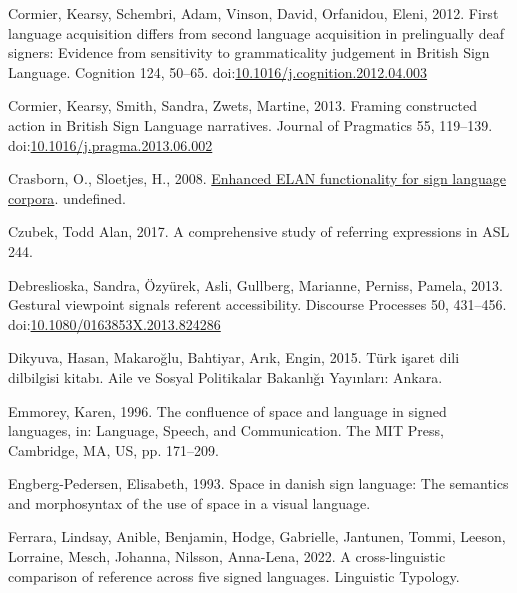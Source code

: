 \documentclass[]{elsarticle} %
\newlength{\cslhangindent}
\newenvironment{CSLReferences}[2] %
 {%
  \setlength{\parindent}{0pt}
  \ifodd #1 \everypar{\setlength{\hangindent}{\cslhangindent}}\ignorespaces\fi
  \ifnum #2 > 0
  \setlength{\parskip}{#2\baselineskip}
  \fi
 }%
 {}
\begin{document}
\begin{CSLReferences}{1}{0}
\leavevmode{}%
Cormier, Kearsy, Schembri, Adam, Vinson, David, Orfanidou, Eleni, 2012.
First language acquisition differs from second language acquisition in
prelingually deaf signers: Evidence from sensitivity to grammaticality
judgement in British Sign Language. Cognition 124, 50--65.
doi:\href{https://doi.org/10.1016/j.cognition.2012.04.003}{10.1016/j.cognition.2012.04.003}

\leavevmode{}%
Cormier, Kearsy, Smith, Sandra, Zwets, Martine, 2013. Framing
constructed action in British Sign Language narratives. Journal of
Pragmatics 55, 119--139.
doi:\href{https://doi.org/10.1016/j.pragma.2013.06.002}{10.1016/j.pragma.2013.06.002}

\leavevmode{}%
Crasborn, O., Sloetjes, H., 2008.
\href{https://www.semanticscholar.org/paper/Enhanced-ELAN-functionality-for-sign-language-Crasborn-Sloetjes/e1623ec6b2bc3532129a3682eb263cc2e7d5389c}{Enhanced
ELAN functionality for sign language corpora}. undefined.

\leavevmode{}%
Czubek, Todd Alan, 2017. A comprehensive study of referring expressions
in ASL 244.

\leavevmode{}%
Debreslioska, Sandra, Özyürek, Asli, Gullberg, Marianne, Perniss,
Pamela, 2013. Gestural viewpoint signals referent accessibility.
Discourse Processes 50, 431--456.
doi:\href{https://doi.org/10.1080/0163853X.2013.824286}{10.1080/0163853X.2013.824286}

\leavevmode{}%
Dikyuva, Hasan, Makaroğlu, Bahtiyar, Arık, Engin, 2015. Türk i{ş}aret
dili dilbilgisi kitab{ı}. Aile ve Sosyal Politikalar Bakanl{ı}{ğ}{ı}
Yay{ı}nlar{ı}: Ankara.

\leavevmode{}%
Emmorey, Karen, 1996. The confluence of space and language in signed
languages, in: Language, Speech, and Communication. The MIT Press,
Cambridge, MA, US, pp. 171--209.

\leavevmode{}%
Engberg-Pedersen, Elisabeth, 1993. Space in danish sign language: The
semantics and morphosyntax of the use of space in a visual language.

\leavevmode{}%
Ferrara, Lindsay, Anible, Benjamin, Hodge, Gabrielle, Jantunen, Tommi,
Leeson, Lorraine, Mesch, Johanna, Nilsson, Anna-Lena, 2022. A
cross-linguistic comparison of reference across five signed languages.
Linguistic Typology.


\end{CSLReferences}
\end{document}
